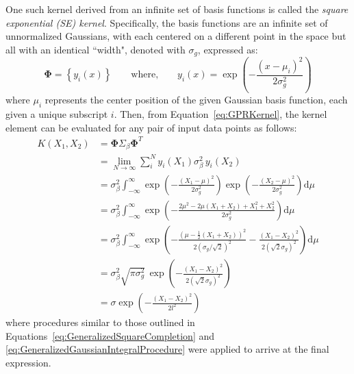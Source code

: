 \documentclass{article}
\begin{document}
One such kernel derived from an infinite set of basis functions is called the \emph{square exponential (SE) kernel}. Specifically, the basis functions are an infinite set of unnormalized Gaussians, with each centered on a different point in the space but all with an identical ``width", denoted with $\sigma_g$, expressed as:
\begin{equation}
\label{eq:GaussianBasisFunction}
	\mathbf{\Phi} = \left\lbrace y_i\!\left(x\right) \right\rbrace \qquad \text{where,} \qquad y_i\!\left(x\right) = \exp\!\left(-\frac{\left(x - \mu_i\right)^2}{2 \sigma_g^2}\right)
\end{equation}
where $\mu_i$ represents the center position of the given Gaussian basis function, each given a unique subscript $i$. Then, from Equation~\eqref{eq:GPRKernel}, the kernel element can be evaluated for any pair of input data points as follows:
\begin{equation}
\label{eq:SEKernelDerivation}
	\begin{aligned}
	K\!\left(X_1,X_2\right) &= \mathbf{\Phi} \Sigma_\beta \mathbf{\Phi}^T \\
	&= \lim\limits_{N \rightarrow \infty} \sum_{i}^{N} y_i\!\left(X_1\right) \sigma_\beta^2 \, y_i\!\left(X_2\right) \\
	&= \sigma_\beta^2 \int_{-\infty}^{\infty} \exp\!\left(-\frac{\left(X_1 - \mu\right)^2}{2 \sigma_g^2}\right) \exp\!\left(-\frac{\left(X_2 - \mu\right)^2}{2 \sigma_g^2}\right) \text{d}\mu \\
	&= \sigma_\beta^2 \int_{-\infty}^{\infty} \exp\!\left(-\frac{2 \mu^2 - 2 \mu \left(X_1 + X_2\right) + X_1^2 + X_2^2}{2 \sigma_g^2}\right) \text{d}\mu \\
	&= \sigma_\beta^2 \int_{-\infty}^{\infty} \exp\!\left(-\frac{\left(\mu - \frac{1}{2} \left(X_1 + X_2\right)\right)^2}{2 \left(\sigma_g / \sqrt{2}\right)^2} - \frac{\left(X_1 - X_2\right)^2}{2 \left(\sqrt{2} \sigma_g\right)^2}\right) \text{d}\mu \\
	&= \sigma_\beta^2 \sqrt{\pi \sigma_g^2} \, \exp\!\left(-\frac{\left(X_1 - X_2\right)^2}{2 \left(\sqrt{2} \sigma_g\right)^2}\right) \\
	&= \sigma \exp\!\left(-\frac{\left(X_1 - X_2\right)^2}{2 l^2}\right)
	\end{aligned}
\end{equation}
where procedures similar to those outlined in Equations~\eqref{eq:GeneralizedSquareCompletion} and \eqref{eq:GeneralizedGaussianIntegralProcedure} were applied to arrive at the final expression.
\end{document}
